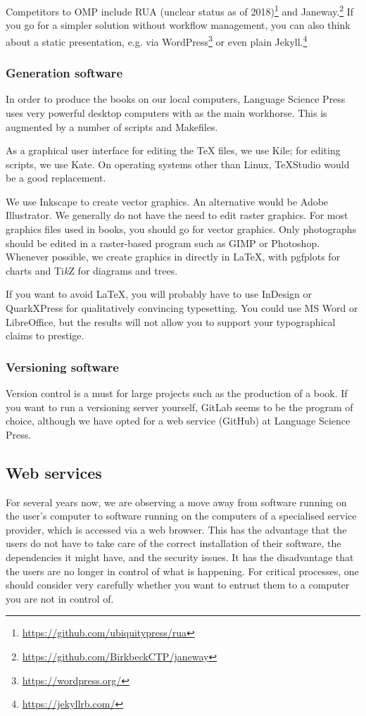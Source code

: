 \documentclass[nonflat,smallfont
]{langsci/langscibook}
\newcommand{\footurl}[1]{\footnote{\url{#1}}}
\begin{document}
Competitors to OMP include RUA (unclear status as of 2018)\footurl{https://github.com/ubiquitypress/rua} and Janeway.\footurl{https://github.com/BirkbeckCTP/janeway} If you go for a simpler solution without workflow management, you can also think about a static presentation, e.g. via WordPress\footurl{https://wordpress.org/} or even plain Jekyll.\footurl{https://jekyllrb.com/} 

\largerpage
\subsubsection{Generation software}
In order to produce the books on our local computers, Language Science Press uses very powerful desktop computers with \xelatex as the main workhorse. This is augmented by a number of scripts and Makefiles. 

As a graphical user interface for editing the TeX files, we use Kile; for editing scripts, we use Kate. On operating systems other than Linux, TeXStudio would be a good replacement. 

We use Inkscape to create vector graphics. An alternative would be Adobe Illustrator. We generally do not have the need to edit raster graphics. For most graphics files used in books, you should go for vector graphics. Only photographs should be edited in a raster-based program such as GIMP or Photoshop. Whenever possible, we create graphics in directly in \LaTeX\xspace, with pgfplots for charts and Ti\textit{k}Z for diagrams and trees. 

If you want to avoid \LaTeX\xspace, you will probably have to use InDesign or QuarkXPress for qualitatively convincing typesetting. You could use MS Word or LibreOffice, but the results will not allow you to support your typographical claims to prestige.


\subsubsection{Versioning software}
Version control is a must for large projects such as the production of a book. If you want to run a versioning server yourself, GitLab seems to be the program of choice, although we have opted for a web service (GitHub) at Language Science Press. 

\subsection{Web services}
For several years now, we are observing a move away from software running on the user's computer to software running on the computers of a specialised service provider, which is accessed via a web browser. This has the advantage that the users do not have to take care of the correct installation of their software, the dependencies it might have, and the security issues. It has the disadvantage that the users are no longer in control of what is happening. For critical processes, one should consider very carefully whether you want to entrust them to a computer you are not in control of. 
\end{document}
